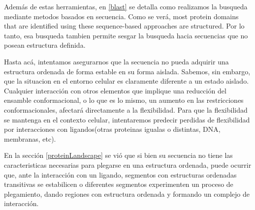Además de estas herramientas, en \ref{blast} se detalla como realizamos la busqueda mediante metodos basados en secuencia. 
Como se verá, most protein domains that are identified using these sequence-based approaches are structured.
Por lo tanto, esa busqueda tambien permite sesgar la busqueda hacia secuencias que no posean estructura definida.











Hasta acá, intentamos asegurarnos que la secuencia no pueda adquirir una estructura ordenada de forma estable en su forma aislada.
Sabemos, sin embargo, que la situacion en el entorno celular es claramente diferente a un estado aislado.
Cualquier interacción con otros elementos que implique una reducción del ensamble conformacional, o lo que es lo mismo, 
un aumento en las restricciones conformacionales, afectará directamente a la flexibilidad. 
Para que la flexibilidad se mantenga en el contexto celular, intentaremos predecir perdidas de flexibilidad por interacciones con ligandos(otras proteinas igualas o distintas, DNA, membranas, etc).



En la sección \ref{proteinLandscape} se vió que si bien su secuencia no tiene las caracteristicas necesarias para plegarse en una estructura ordenada, puede ocurrir que, ante la interacción con un ligando, 
segmentos con estructuras ordenadas transitivas se estabilicen o diferentes segmentos experimenten un proceso de plegamiento, dando regiones con estructura ordenada y formando un complejo de interacción. 

